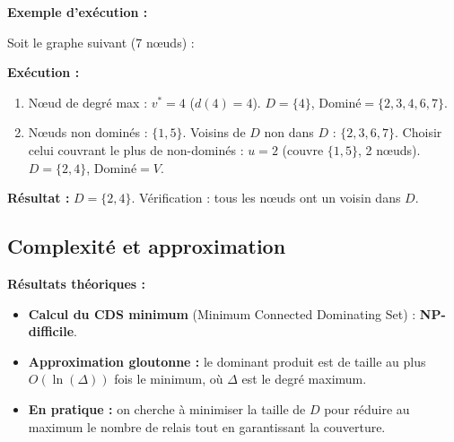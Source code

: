 \documentclass[12pt,a4paper]{article}
\begin{document}
\begin{exemple}
\textbf{Exemple d'exécution :}

Soit le graphe suivant (7 nœuds) :

\begin{center}
\end{center}

\textbf{Exécution :}
\begin{enumerate}
    \item Nœud de degré max : $v^* = 4$ ($d(4) = 4$).
          $D = \{4\}$, $\text{Dominé} = \{2, 3, 4, 6, 7\}$.
    \item Nœuds non dominés : $\{1, 5\}$.
          Voisins de $D$ non dans $D$ : $\{2, 3, 6, 7\}$.
          Choisir celui couvrant le plus de non-dominés :
          $u = 2$ (couvre $\{1, 5\}$, 2 nœuds).
          $D = \{2, 4\}$, $\text{Dominé} = V$.
\end{enumerate}

\textbf{Résultat :} $D = \{2, 4\}$. Vérification : tous les nœuds ont un voisin dans $D$.
\end{exemple}

\subsection{Complexité et approximation}

\begin{important}
\textbf{Résultats théoriques :}

\begin{itemize}
    \item \textbf{Calcul du CDS minimum} (Minimum Connected Dominating Set) :
          \textcolor{importantrouge}{\textbf{NP-difficile}}.
    \item \textbf{Approximation gloutonne :} le dominant produit est de taille au plus
          $O(\ln(\Delta))$ fois le minimum, où $\Delta$ est le degré maximum.
    \item \textbf{En pratique :} on cherche à minimiser la taille de $D$ pour réduire au
          maximum le nombre de relais tout en garantissant la couverture.
\end{itemize}
\end{important}
\end{document}
